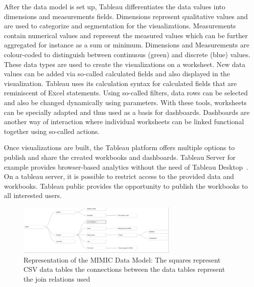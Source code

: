 \documentclass[aac]{iosart2x}
\begin{document}
After the data model is set up, Tableau differentiates the data values into dimensions and measurements fields. Dimensions represent qualitative values and are used to categorize and segmentation for the visualizations. Measurements contain numerical values and represent the measured values which can be further aggregated for instance as a sum or minimum. Dimensions and Measurements are colour-coded to distinguish between continuous (green) and discrete (blue) values. These data types are used to create the visualizations on a worksheet. New data values can be added via so-called calculated fields and also displayed in the visualization. Tableau uses its calculation syntax for calculated fields that are reminiscent of Excel statements. Using so-called filters, data rows can be selected and also be changed dynamically using parameters. With these tools, worksheets can be specially adapted and thus used as a basis for dashboards. Dashboards are another way of interaction where individual worksheets can be linked functional together using so-called actions.

Once visualizations are built, the Tableau platform offers multiple options to publish and share the created workbooks and dashboards. Tableau Server for example provides browser-based analytics without the need of Tableau Desktop~\cite{Tableau.20.03.2021}. On a tableau server, it is possible to restrict access to the provided data and workbooks. Tableau public provides the opportunity to publish the workbooks to all interested users.


\begin{figure}[ht]
\includegraphics[width=0.7\textwidth]{images/datamodel_1.png}
\caption{Representation of the MIMIC Data Model: The squares represent CSV data tables the connections between the data tables represent the join relations used}\label{f1}
\end{figure}
\end{document}
